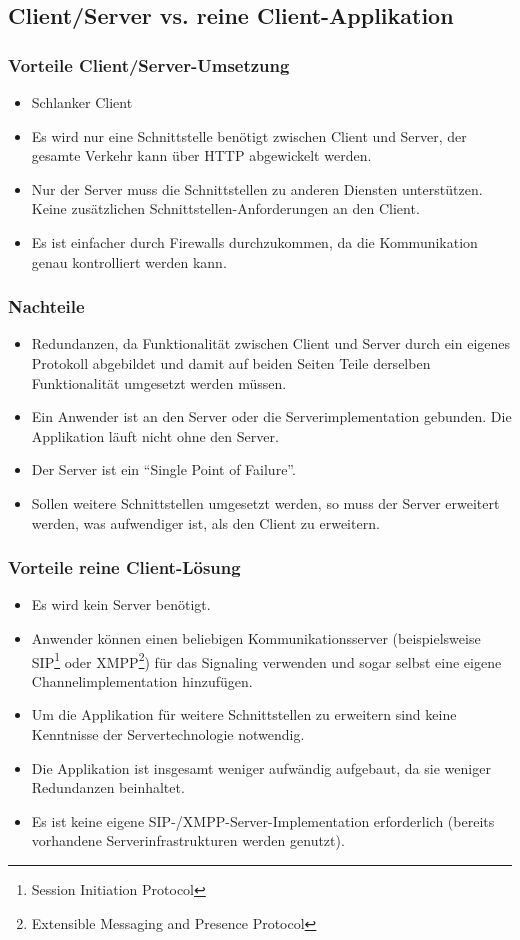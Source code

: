	\subsection{Client/Server vs. reine Client-Applikation}
		\subsubsection{Vorteile Client/Server-Umsetzung}
		\begin{itemize}
			\item Schlanker Client
			\item Es wird nur eine Schnittstelle benötigt zwischen Client und Server, der gesamte Verkehr kann über HTTP abgewickelt werden.
			\item Nur der Server muss die Schnittstellen zu anderen Diensten
			unterstützen. Keine zusätzlichen Schnittstellen-Anforderungen an den Client.
			\item Es ist einfacher durch Firewalls durchzukommen, da die Kommunikation genau kontrolliert werden kann.
		\end{itemize}
		\subsubsection{Nachteile}
		\begin{itemize}
			\item Redundanzen, da Funktionalität zwischen Client und Server durch
			ein eigenes Protokoll abgebildet und damit auf beiden Seiten Teile derselben
			Funktionalität umgesetzt werden müssen.
			\item Ein Anwender ist an den Server oder die Serverimplementation gebunden.
			Die Applikation läuft nicht ohne den Server.
			\item Der Server ist ein "`Single Point of Failure"'.
			\item Sollen weitere Schnittstellen umgesetzt werden, so muss der Server
			erweitert werden, was aufwendiger ist, als den Client zu erweitern.
		\end{itemize}


		\subsubsection{Vorteile reine Client-Lösung}
		\begin{itemize}
			\item Es wird kein Server benötigt.
			\item Anwender können einen beliebigen Kommunikationsserver
			(beispielsweise SIP\footnote{Session Initiation Protocol} oder
			XMPP\footnote{Extensible Messaging and Presence Protocol}) für das
			Signaling verwenden und sogar selbst eine eigene Channelimplementation
			hinzufügen.
			\item Um die Applikation für weitere Schnittstellen zu erweitern sind keine
			Kenntnisse der Servertechnologie notwendig.
			\item Die Applikation ist insgesamt weniger aufwändig aufgebaut, da sie
			weniger Redundanzen beinhaltet.
			\item Es ist keine eigene SIP-/XMPP-Server-Implementation erforderlich
			(bereits vorhandene Serverinfrastrukturen werden genutzt).
		\end{itemize}
